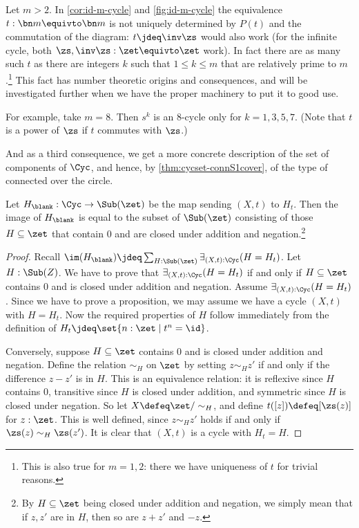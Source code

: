 \begin{remark}\label{rem:thenonuniquenessofgeneratorsofmodulararithmetic1} 
  Let $m>2$.
  In \cref{cor:id-m-cycle} and \cref{fig:id-m-cycle} the equivalence 
  $t:\bn m\equivto\bn m$ is not uniquely determined by $P(t)$ and the
  commutation of the diagram: $t\jdeq\inv\zs$ would also work 
  (for the infinite cycle, both $\zs,\inv\zs: \zet\equivto\zet$ work).
  In fact there are as many such $t$ as there are integers $k$ such that
  $1\leq k\leq m$ that are relatively prime to $m$.\footnote{%
  This is also true for $m=1,2$: there we have uniqueness of $t$ for trivial reasons.}
  This fact has number theoretic origins and consequences, 
  and will be investigated further when we
  have the proper machinery to put it to good use. 

  For example, take $m=8$. Then $s^k$ is an $8$-cycle only for $k=1,3,5,7$.
  (Note that $t$ is a power of $\zs$ if $t$ commutes with $\zs$.)
\end{remark}
And as a third consequence,
we get a more concrete description of the set of components of $\Cyc$,
and hence, by \cref{thm:cycset-connS1cover},
of the type of connected \coverings over the circle.
\begin{corollary}\label{cor:set-trunc-cyc}
  Let $H_\blank : \Cyc \to \Sub(\zet)$ be the map sending $(X,t)$ to $H_t$.
  Then the image of $H_\blank$ is equal to the
  subset of $\Sub(\zet)$ consisting of those
  $H\subseteq\zet$ that contain $0$ and are closed
  under addition and negation.\footnote{%
    By $H\subseteq \zet$ being closed under addition and negation,
    we simply mean that if $z,z'$ are in $H$,
    then so are $z+z'$ and $-z$.}
\end{corollary}
\begin{proof}
  Recall $\im(H_\blank)\jdeq\sum_{H:\Sub(\zet)}\exists_{(X,t):\Cyc}(H=H_t)$.
  Let $H:\Sub(Z)$.
  We have to prove that $\exists_{(X,t):\Cyc}(H=H_t)$
  if and only if $H\subseteq\zet$ contains $0$ and
  is closed under addition and negation.
  Assume $\exists_{(X,t):\Cyc}(H=H_t)$.
  Since we have to prove a proposition,
  we may assume we have a cycle $(X,t)$ with
  $H=H_t$. Now the required properties of $H$ follow immediately from
  the definition of $H_t\jdeq\set{n:\zet \mid t^n = \id}$.

  Conversely, suppose $H \subseteq \zet$ contains $0$ and
  is closed under addition and negation.
  Define the relation $\sim_H$ on $\zet$ by setting $z \sim_H z'$
  if and only if the difference $z-z'$ is in $H$.
  This is an equivalence relation:
  it is reflexive since $H$ contains $0$,
  transitive since $H$ is closed under addition,
  and symmetric since $H$ is closed under negation.
  So let $X \defeq \zet/\sim_H$, and define $t([z])\defeq[\zs(z)]$
  for $z:\zet$.
  This is well defined, since $z \sim_H z'$ holds if and only if
  $\zs(z) \sim_H \zs(z')$.
  It is clear that $(X,t)$ is a cycle with $H_t = H$.
\end{proof}

